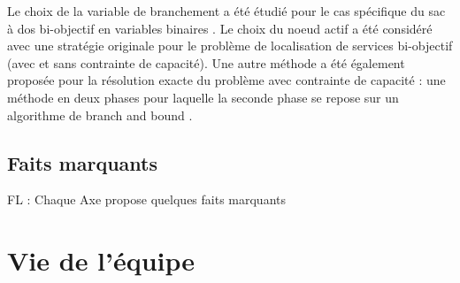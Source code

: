 \begin{enumerate}
Le choix de la variable de branchement a été étudié pour le cas spécifique du sac à dos bi-objectif en variables binaires \cite{cerqueus:hal-01564982}. Le choix du noeud actif a été considéré avec une stratégie originale pour le problème de localisation de services bi-objectif \cite{delmee:hal-01435524} (avec et sans contrainte de capacité). Une autre méthode a  été également proposée pour la résolution exacte du problème avec contrainte de capacité : une méthode en deux phases pour laquelle la seconde phase se repose sur un algorithme de branch and bound \cite{delmee:hal-02480176}. 
\end{enumerate}
	







  		
\subsection{Faits marquants}

   FL : Chaque Axe propose quelques faits marquants 

\section{Vie de l'équipe}

	
